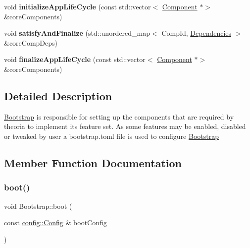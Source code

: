 \begin{DoxyCompactItemize}
\item 
\mbox{\label{classtheoria_1_1core_1_1Bootstrap_a3a133cd93cbe09ba4799d2a72bc9fde6}} 
void {\bfseries initialize\+App\+Life\+Cycle} (const std\+::vector$<$ \hyperlink{classtheoria_1_1core_1_1Component}{Component} $\ast$$>$ \&core\+Components)
\item 
\mbox{\label{classtheoria_1_1core_1_1Bootstrap_a863bc8162f5e60cd6520f81b8809b9c1}} 
void {\bfseries satisfy\+And\+Finalize} (std\+::unordered\+\_\+map$<$ Comp\+Id, \hyperlink{classtheoria_1_1core_1_1Dependencies}{Dependencies} $>$ \&core\+Comp\+Deps)
\item 
\mbox{\label{classtheoria_1_1core_1_1Bootstrap_a4a41a82a056bb7143fc7ff0f4df8c01d}} 
void {\bfseries finalize\+App\+Life\+Cycle} (const std\+::vector$<$ \hyperlink{classtheoria_1_1core_1_1Component}{Component} $\ast$$>$ \&core\+Components)
\end{DoxyCompactItemize}


\subsection{Detailed Description}
\hyperlink{classtheoria_1_1core_1_1Bootstrap}{Bootstrap} is responsible for setting up the components that are required by theoria to implement its feature set. As some features may be enabled, disabled or tweaked by user a bootstrap.\+toml file is used to configure \hyperlink{classtheoria_1_1core_1_1Bootstrap}{Bootstrap} 

\subsection{Member Function Documentation}
\mbox{\label{classtheoria_1_1core_1_1Bootstrap_acfcc189dd0c09ed9052917ef7ce24565}} 
\subsubsection{\texorpdfstring{boot()}{boot()}}
{\footnotesize\ttfamily void Bootstrap\+::boot (\begin{DoxyParamCaption}\item[{const \hyperlink{classtheoria_1_1config_1_1Config}{config\+::\+Config} \&}]{boot\+Config }\end{DoxyParamCaption})}

